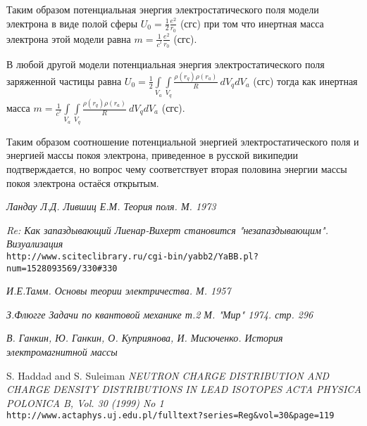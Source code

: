 \documentclass{article}
\begin{document}
Таким образом потенциальная энергия электростатического поля модели электрона в виде полой сферы 
${U}_{0} =\frac{1}{2}\frac{e^2}{{{r}_{0}}}$ (сгс)
при том что инертная масса электрона этой модели равна
$m =\frac{1}{{{c}^{^{2}}}}\frac{e^2}{{{r}_{0}}}$ (сгс).

В любой другой модели потенциальная энергия электростатического поля заряженной частицы равна
${U}_{0}=\frac{1}{2}\int\limits_{{{V}_{a}}}{\int\limits_{{{V}_{q}}}{\frac{\rho \left( {{r}_{q}} \right)\rho \left( {{r}_{a}} \right)}{R}}}\ d{{V}_{q}}d{{V}_{a}}$ (сгс)
тогда как инертная масса 
$m=\frac{1}{{{c}^{^{2}}}}\int\limits_{{{V}_{a}}}{\int\limits_{{{V}_{q}}}{\frac{\rho \left( {{r}_{q}} \right)\rho \left( {{r}_{a}} \right)}{R}}}\ d{{V}_{q}}d{{V}_{a}}$ (сгс).

Таким образом соотношение потенциальной энергией электростатического поля и энергией массы покоя электрона, приведенное в русской википедии подтверждается, но вопрос чему соответствует вторая половина энергии массы покоя электрона остаёся открытым.


\begin{thebibliography}{99}

\textit{Ландау Л.Д. Лившиц Е.М. Теория поля. М. 1973}

\textit{Re: Как запаздывающий Лиенар-Вихерт становится "незапаздывающим". Визуализация}
\\\texttt{http://www.sciteclibrary.ru/cgi-bin/yabb2/YaBB.pl?num=1528093569/330\#330}

\textit{И.Е.Тамм. Основы теории электричества. М. 1957}

\textit{З.Флюгге Задачи по квантовой механике т.2 М. "Мир" 1974. стр. 296}

\textit{В. Ганкин, Ю. Ганкин, О. Куприянова, И. Мисюченко. История электромагнитной массы}


S. Haddad and S. Suleiman
\textit{NEUTRON CHARGE DISTRIBUTION AND CHARGE DENSITY DISTRIBUTIONS IN LEAD ISOTOPES}
\textit{ACTA PHYSICA POLONICA B, Vol. 30 (1999) No 1}
\\\texttt{http://www.actaphys.uj.edu.pl/fulltext?series=Reg\&vol=30\&page=119}



\end{thebibliography}
\end{document}
